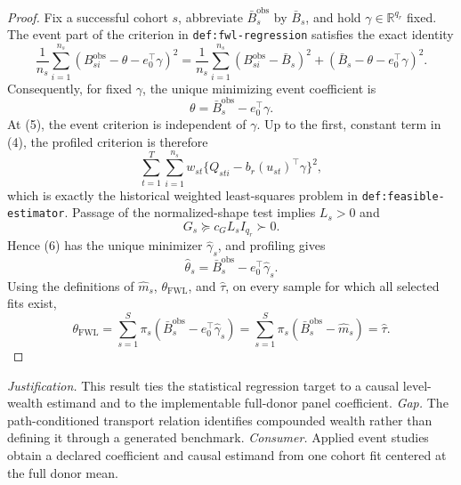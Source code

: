 \documentclass{article}
\begin{document}
\begin{proof}
Fix a successful cohort \(s\), abbreviate
\(\bar B_s^{\mathrm{obs}}\) by \(\bar B_s\), and hold
\(\gamma\in\mathbb R^{q_r}\) fixed.  The event part of the criterion in
\texttt{def:fwl-regression} satisfies the exact identity
\[
\frac1{n_s}\sum_{i=1}^{n_s}
(B_{si}^{\mathrm{obs}}-\theta-e_0^\top\gamma)^2
=\frac1{n_s}\sum_{i=1}^{n_s}(B_{si}^{\mathrm{obs}}-\bar B_s)^2
+(\bar B_s-\theta-e_0^\top\gamma)^2.
\tag{4}
\]
Consequently, for fixed \(\gamma\), the unique minimizing event coefficient is
\[
\theta=\bar B_s^{\mathrm{obs}}-e_0^\top\gamma.
\tag{5}
\]
At (5), the event criterion is independent of \(\gamma\).  Up to the first,
constant term in (4), the profiled criterion is therefore
\[
\sum_{t=1}^{T}\sum_{i=1}^{n_s}
w_{st}\{Q_{sti}-b_r(u_{st})^\top\gamma\}^2,
\tag{6}
\]
which is exactly the historical weighted least-squares problem in
\texttt{def:feasible-estimator}.  Passage of the normalized-shape test implies
\(L_s>0\) and
\[
G_s\succeq c_GL_sI_{q_r}\succ0.
\]
Hence (6) has the unique minimizer \(\widehat\gamma_s\), and profiling gives
\[
\widehat\theta_s
=\bar B_s^{\mathrm{obs}}-e_0^\top\widehat\gamma_s.
\tag{7}
\]
Using the definitions of \(\widehat m_s\), \(\theta_{\mathrm{FWL}}\), and
\(\widehat\tau\), on every sample for which all selected fits exist,
\[
\theta_{\mathrm{FWL}}
=\sum_{s=1}^{S}\pi_s
(\bar B_s^{\mathrm{obs}}-e_0^\top\widehat\gamma_s)
=\sum_{s=1}^{S}\pi_s(\bar B_s^{\mathrm{obs}}-\widehat m_s)
=\widehat\tau.
\]
\end{proof}
\par\smallskip\noindent \textit{Justification.} This result ties the statistical regression target to a causal level-wealth estimand and to the implementable full-donor panel coefficient. \textit{Gap.} The path-conditioned transport relation identifies compounded wealth rather than defining it through a generated benchmark. \textit{Consumer.} Applied event studies obtain a declared coefficient and causal estimand from one cohort fit centered at the full donor mean.
\end{document}

